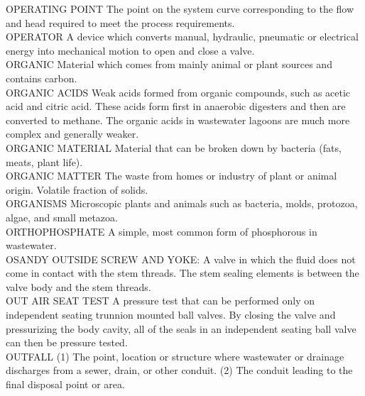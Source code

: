 \documentclass{article}
\begin{document}
OPERATING POINT
The point on the system curve corresponding to the flow and head required to meet the process requirements.
\vspace{0.3cm}\\
OPERATOR
A device which converts manual, hydraulic, pneumatic or electrical energy into mechanical motion to open and close a valve.
\vspace{0.3cm}\\
ORGANIC
Material which comes from mainly animal or plant sources and contains carbon. 
\vspace{0.3cm}\\
ORGANIC ACIDS
Weak acids formed from organic compounds, such as acetic acid and citric acid. These acids form first in anaerobic digesters and then are converted to methane. The organic acids in wastewater lagoons are much more complex and generally weaker.
\vspace{0.3cm}\\
ORGANIC MATERIAL
Material that can be broken down by bacteria (fats, meats, plant life).
\vspace{0.3cm}\\
ORGANIC MATTER
The waste from homes or industry of plant or animal origin. Volatile fraction of solids.
\vspace{0.3cm}\\
ORGANISMS
Microscopic plants and animals such as bacteria, molds, protozoa, algae, and small metazoa.
\vspace{0.3cm}\\
ORTHOPHOSPHATE
A simple, most common form of phosphorous in wastewater.
\vspace{0.3cm}\\
OSANDY
OUTSIDE SCREW AND YOKE:  A valve in which the fluid does not come in contact with the stem threads. The stem sealing elements is between the valve body and the stem threads.
\vspace{0.3cm}\\
OUT AIR SEAT TEST
A pressure test that can be performed only on independent seating trunnion mounted ball valves. By closing the valve and pressurizing the body cavity, all of the seals in an independent seating ball valve can then be pressure tested.
\vspace{0.3cm}\\
OUTFALL
(1) The point, location or structure where wastewater or drainage discharges from a sewer, drain, or other conduit. (2) The conduit leading to the final disposal point or area. 
\vspace{0.3cm}\\
\end{document}
